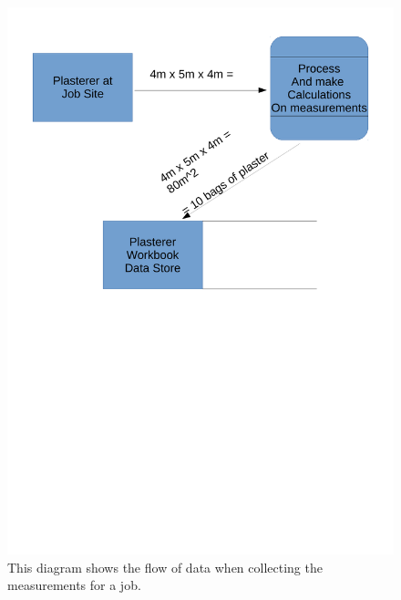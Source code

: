 \begin{figure}[H]
    \includegraphics[width=\textwidth]{./Analysis/images/GettingMeasurements.pdf}
    \caption{This diagram shows the flow of data when collecting the measurements for a job.} \label{fig:getting_measurements_data_flow_diagram}
\end{figure}


